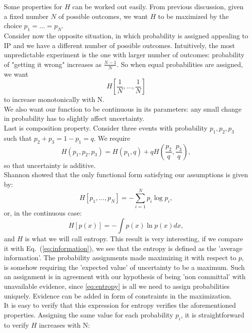 \documentclass[twocolumn,showpacs,preprintnumbers,nofootinbib,prd,
superscriptaddress,10pt]{revtex4-1}
\begin{document}
Some properties for $H$ can be worked out easily. 
From previous discussion, given a fixed number $N$ of possible outcomes, we want $H$ to be maximized by the choice $p_1 = \dots = p_N$. \\ 
Consider now the opposite situation, in which probability is assigned appealing to IP and we have a different number of possible outcomes.
Intuitively, the most unpredictable experiment is the one with larger number of outcomes: probability of "getting it wrong" increases as $\frac{N -1}{N}$. So when equal probabilities are assigned, we want
\begin{equation}
    \nonumber
    H\left[\frac{1}{N}, \dots, \frac{1}{N}\right]
\end{equation}
to increase monotonically with N. \\ 
We also want our function to be continuous in its parameters: any small change in probability has to slightly affect uncertainty. \\
Last is composition property. Consider three events with probability $p_1, p_2, p_3$ such that $p_2 + p_3 = 1 - p_1 = q$. We require 
\begin{equation}
    H\left(p_1, p_2, p_3\right) = H(p_1, q) + qH\left(\frac{p_2}{q}, \frac{p_3}{q}\right),
\end{equation}
so that uncertainty is additive. \\ 
Shannon \cite{Shannon} showed that the only functional form satisfying our assumptions is given by:
\begin{equation}\label{eq:entropy}
    H[p_1, \dots, p_N] = - \sum_{i = 1}^N p_i\log{p_i},
\end{equation}
or, in the continuous case:
\begin{equation}
    H[p(x)] = - \int p(x)\ln p(x) dx,
\end{equation}
and $H$ is what we will call entropy. This result is very interesting, if we compare it with Eq.~(\ref{eq:information}), we see that the entropy is defined as the 'average information'. The probability assignments made maximizing it with respect to $p$, is somehow requiring  the 'expected value' of uncertainty to be a maximum. Such an assignment is in agreement with our hypothesis of being 'non committal' with unavailable evidence, since \ref{eq:entropy} is all we need to assign probabilities uniquely. Evidence can be added in form of constraints in the maximization. \\ It is easy to verify that this expression for entropy verifies the aforementioned properties. 
Assigning the same value for each probability $p_i$, it is straightforward to verify $H$ increases with N: 
\end{document}
